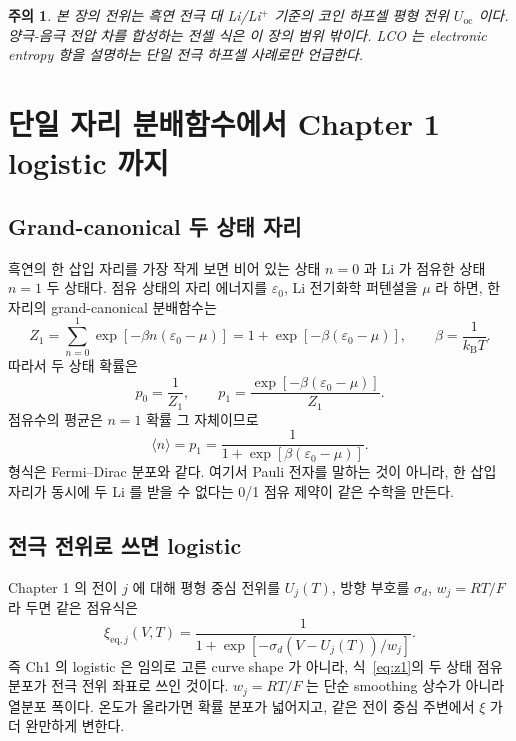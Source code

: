 \documentclass[11pt,a4paper]{article}
\newtheorem*{warnbox}{주의}
\newcommand{\eq}{\mathrm{eq}}
\newcommand{\oc}{\mathrm{oc}}
\newcommand{\kB}{k_\mathrm{B}}
\begin{document}
\begin{warnbox}
본 장의 전위는 흑연 전극 대 Li/Li$^+$ 기준의 코인 하프셀 평형 전위 $U_\oc$ 이다.
양극-음극 전압 차를 합성하는 전셀 식은 이 장의 범위 밖이다. LCO 는 electronic
entropy 항을 설명하는 \emph{단일 전극 하프셀 사례}로만 언급한다.
\end{warnbox}

\section{단일 자리 분배함수에서 Chapter 1 logistic 까지}
\label{sec:partition}
\subsection{Grand-canonical 두 상태 자리}
흑연의 한 삽입 자리를 가장 작게 보면 비어 있는 상태 $n=0$ 과 Li 가 점유한 상태
$n=1$ 두 상태다. 점유 상태의 자리 에너지를 $\varepsilon_0$, Li 전기화학 퍼텐셜을
$\mu$ 라 하면, 한 자리의 grand-canonical 분배함수는
\begin{equation}
Z_1=\sum_{n=0}^{1}\exp[-\beta n(\varepsilon_0-\mu)]
=1+\exp[-\beta(\varepsilon_0-\mu)],
\qquad \beta=\frac{1}{\kB T}.
\label{eq:z1}
\end{equation}
따라서 두 상태 확률은
\begin{equation}
p_0=\frac{1}{Z_1},\qquad
p_1=\frac{\exp[-\beta(\varepsilon_0-\mu)]}{Z_1}.
\label{eq:p01}
\end{equation}
점유수의 평균은 $n=1$ 확률 그 자체이므로
\begin{equation}
\langle n\rangle=p_1
=\frac{1}{1+\exp[\beta(\varepsilon_0-\mu)]}.
\label{eq:fermi_form}
\end{equation}
형식은 Fermi--Dirac 분포와 같다. 여기서 Pauli 전자를 말하는 것이 아니라, 한
삽입 자리가 동시에 두 Li 를 받을 수 없다는 0/1 점유 제약이 같은 수학을 만든다.

\subsection{전극 전위로 쓰면 logistic}
Chapter 1 의 전이 $j$ 에 대해 평형 중심 전위를 $U_j(T)$, 방향 부호를 $\sigma_d$,
$w_j=RT/F$ 라 두면 같은 점유식은
\begin{equation}
\xi_{\eq,j}(V,T)
=\frac{1}{1+\exp[-\sigma_d(V-U_j(T))/w_j]}.
\label{eq:ch1_logistic}
\end{equation}
즉 Ch1 의 logistic 은 임의로 고른 curve shape 가 아니라, 식~\eqref{eq:z1}의 두
상태 점유 분포가 전극 전위 좌표로 쓰인 것이다. $w_j=RT/F$ 는 단순 smoothing
상수가 아니라 열분포 폭이다. 온도가 올라가면 확률 분포가 넓어지고, 같은 전이
중심 주변에서 $\xi$ 가 더 완만하게 변한다.
\end{document}
